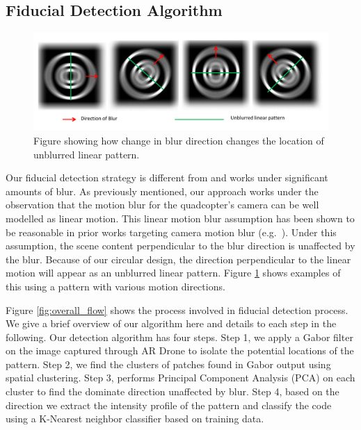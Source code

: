 \documentclass[runningheads]{llncs}
\begin{document}
\subsection{Fiducial Detection Algorithm}

\begin{figure}
\centering
\includegraphics[width=\linewidth]{blur_direction.pdf}
\caption{Figure showing how change in blur direction changes the location of
unblurred linear pattern.}
\label{fig:blur_direction}
\end{figure}

Our fiducial detection strategy is different from \cite{NaimarkF02,Pitag13} and works
under significant amounts of blur.   As previously mentioned, our approach works
under the observation that the motion blur for the quadcopter's camera
can be well modelled as linear motion.  This  linear motion blur assumption has been shown to be
reasonable in prior works targeting camera motion blur (e.g.~\cite{Moshe:2003,Moshe:2004}).
Under this assumption, the scene content perpendicular to the blur direction is
unaffected by the blur.  Because of our circular design, the
direction perpendicular to the linear motion will appear as an unblurred linear
pattern.  Figure \ref{fig:blur_direction} shows examples of this using a
pattern  with various motion directions.

Figure \ref{fig:overall_flow} shows the process involved in fiducial
detection process. We give a brief overview of our algorithm here and details
to each step in the following.  Our detection algorithm has four steps. Step 1,
we apply a Gabor filter on the image captured through AR Drone to isolate the
potential locations of the pattern.  Step 2, we find the clusters of patches
found in Gabor output using spatial clustering.  Step 3, performs Principal
Component Analysis (PCA) on each cluster to find the dominate direction
unaffected by blur.  Step 4, based on the direction we extract the intensity
profile of the pattern and classify the code using a K-Nearest neighbor
classifier based on training data.
\end{document}
